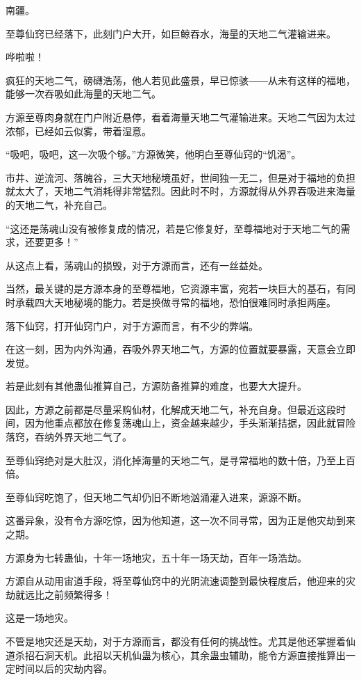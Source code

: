 
\begin{this_body}

南疆。

至尊仙窍已经落下，此刻门户大开，如巨鲸吞水，海量的天地二气灌输进来。

哗啦啦！

疯狂的天地二气，磅礴浩荡，他人若见此盛景，早已惊骇――从未有这样的福地，能够一次吞吸如此海量的天地二气。

方源至尊肉身就在门户附近悬停，看着海量天地二气灌输进来。天地二气因为太过浓郁，已经如云似雾，带着湿意。

“吸吧，吸吧，这一次吸个够。”方源微笑，他明白至尊仙窍的“饥渴”。

市井、逆流河、落魄谷，三大天地秘境虽好，世间独一无二，但是对于福地的负担就太大了，天地二气消耗得非常猛烈。因此时不时，方源就得从外界吞吸进来海量的天地二气，补充自己。

“这还是荡魂山没有被修复成的情况，若是它修复好，至尊福地对于天地二气的需求，还要更多！”

从这点上看，荡魂山的损毁，对于方源而言，还有一丝益处。

当然，最关键的是方源本身的至尊福地，它资源丰富，宛若一块巨大的基石，有同时承载四大天地秘境的能力。若是换做寻常的福地，恐怕很难同时承担两座。

落下仙窍，打开仙窍门户，对于方源而言，有不少的弊端。

在这一刻，因为内外沟通，吞吸外界天地二气，方源的位置就要暴露，天意会立即发觉。

若是此刻有其他蛊仙推算自己，方源防备推算的难度，也要大大提升。

因此，方源之前都是尽量采购仙材，化解成天地二气，补充自身。但最近这段时间，因为他重点都放在修复荡魂山上，资金越来越少，手头渐渐拮据，因此就冒险落窍，吞纳外界天地二气了。

至尊仙窍绝对是大肚汉，消化掉海量的天地二气，是寻常福地的数十倍，乃至上百倍。

至尊仙窍吃饱了，但天地二气却仍旧不断地汹涌灌入进来，源源不断。

这番异象，没有令方源吃惊，因为他知道，这一次不同寻常，因为正是他灾劫到来之期。

方源身为七转蛊仙，十年一场地灾，五十年一场天劫，百年一场浩劫。

方源自从动用宙道手段，将至尊仙窍中的光阴流速调整到最快程度后，他迎来的灾劫就远比之前频繁得多！

这是一场地灾。

不管是地灾还是天劫，对于方源而言，都没有任何的挑战性。尤其是他还掌握着仙道杀招石洞天机。此招以天机仙蛊为核心，其余蛊虫辅助，能令方源直接推算出一定时间以后的灾劫内容。


\end{this_body}
